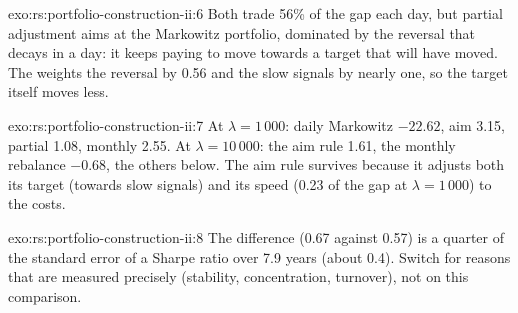 \begin{solution}{exo:rs:portfolio-construction-ii:6}
Both trade 56\% of the gap each day, but partial adjustment aims at the Markowitz portfolio, dominated by the reversal that decays in a day: it keeps paying to move
towards a target that will have moved. The  weights the reversal by 0.56 and the slow signals by nearly one, so the target itself moves less.
\end{solution}

\begin{solution}{exo:rs:portfolio-construction-ii:7}
At $\lambda = 1\,000$: daily Markowitz $-22.62$, aim 3.15, partial 1.08, monthly 2.55. At $\lambda = 10\,000$: the aim rule 1.61, the monthly rebalance $-0.68$, the
others below. The aim rule survives because it adjusts both its target (towards slow signals) and its speed (0.23 of the gap at $\lambda = 1\,000$) to the costs.
\end{solution}

\begin{solution}{exo:rs:portfolio-construction-ii:8}
The difference (0.67 against 0.57) is a quarter of the standard error of a Sharpe ratio over 7.9 years (about 0.4). Switch for reasons that are measured
precisely (stability, concentration, turnover), not on this comparison.
\end{solution}

